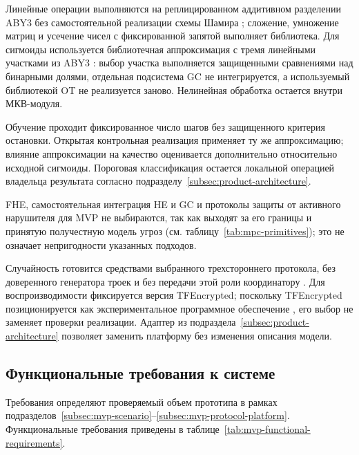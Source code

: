Линейные операции выполняются на реплицированном аддитивном разделении ABY3 без самостоятельной реализации схемы Шамира \cite{20}\cite{21}; сложение, умножение матриц и усечение чисел с фиксированной запятой выполняет библиотека. Для сигмоиды используется библиотечная аппроксимация с тремя линейными участками из ABY3 \cite{21}: выбор участка выполняется защищенными сравнениями над бинарными долями, отдельная подсистема GC не интегрируется, а используемый библиотекой OT не реализуется заново. Нелинейная обработка остается внутри МКВ-модуля.

Обучение проходит фиксированное число шагов без защищенного критерия остановки. Открытая контрольная реализация применяет ту же аппроксимацию; влияние аппроксимации на качество оценивается дополнительно относительно исходной сигмоиды. Пороговая классификация остается локальной операцией владельца результата согласно подразделу~\ref{subsec:product-architecture}.

FHE, самостоятельная интеграция HE и GC и протоколы защиты от активного нарушителя для MVP не выбираются, так как выходят за его границы и принятую получестную модель угроз (см. таблицу~\ref{tab:mpc-primitives}); это не означает непригодности указанных подходов.

Случайность готовится средствами выбранного трехстороннего протокола, без доверенного генератора троек и без передачи этой роли координатору \cite{20}\cite{21}. Для воспроизводимости фиксируется версия TFEncrypted; поскольку TFEncrypted позиционируется как экспериментальное программное обеспечение \cite{21}, его выбор не заменяет проверки реализации. Адаптер из подраздела~\ref{subsec:product-architecture} позволяет заменить платформу без изменения описания модели.

\subsection{Функциональные требования к системе}
\label{subsec:mvp-requirements}

Требования определяют проверяемый объем прототипа в рамках подразделов~\ref{subsec:mvp-scenario}--\ref{subsec:mvp-protocol-platform}. Функциональные требования приведены в таблице~\ref{tab:mvp-functional-requirements}.

